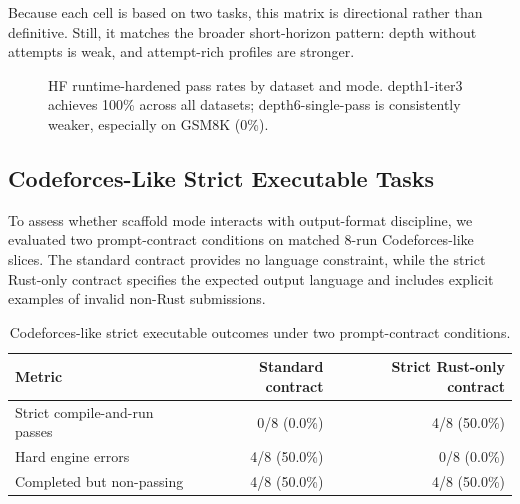 \documentclass[11pt]{article}
\begin{document}
Because each cell is based on two tasks, this matrix is directional rather than definitive. Still, it matches the broader short-horizon pattern: depth without attempts is weak, and attempt-rich profiles are stronger.

\begin{figure}[t]
\centering
{}
\caption{HF runtime-hardened pass rates by dataset and mode. depth1-iter3 achieves 100\% across all datasets; depth6-single-pass is consistently weaker, especially on GSM8K (0\%).}
\label{fig:hf-matrix-bars}
\end{figure}

\subsection{Codeforces-Like Strict Executable Tasks}
To assess whether scaffold mode interacts with output-format discipline, we evaluated two prompt-contract conditions on matched 8-run Codeforces-like slices. The standard contract provides no language constraint, while the strict Rust-only contract specifies the expected output language and includes explicit examples of invalid non-Rust submissions.

\begin{table}[t]
\centering
\caption{Codeforces-like strict executable outcomes under two prompt-contract conditions.}
\label{tab:cf-contract-comparison}
\begin{tabular}{lrr}
\toprule
Metric & Standard contract & Strict Rust-only contract \\
\midrule
Strict compile-and-run passes & 0/8 (0.0\%) & 4/8 (50.0\%) \\
Hard engine errors & 4/8 (50.0\%) & 0/8 (0.0\%) \\
Completed but non-passing & 4/8 (50.0\%) & 4/8 (50.0\%) \\
\bottomrule
\end{tabular}
\end{table}
\end{document}
